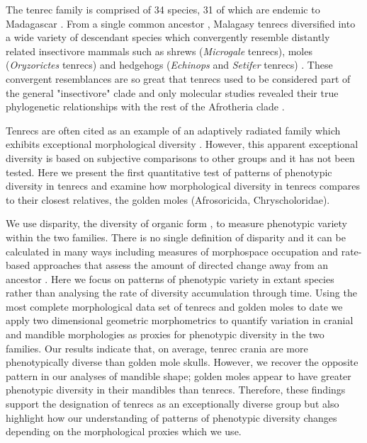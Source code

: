 \documentclass[12pt,a4paper]{article}
\begin{document}
The tenrec family is comprised of 34 species, 31 of which are endemic to Madagascar \citep{Olson2013}. From a single common ancestor \citep{Asher2006}, Malagasy tenrecs diversified into a wide variety of descendant species which convergently resemble distantly related insectivore mammals such as shrews (\textit{Microgale} tenrecs), moles (\textit{Oryzorictes} tenrecs) and hedgehogs (\textit{Echinops} and \textit{Setifer} tenrecs) \citep{Eisenberg1969}. These convergent resemblances are so great that tenrecs used to be considered part of the general "insectivore" clade and only molecular studies revealed their true phylogenetic relationships with the rest of the Afrotheria clade \citep{Stanhope1998}.  

Tenrecs are often cited as an example of an adaptively radiated family which exhibits exceptional morphological diversity \citep{Soarimalala2011, Olson2003, Eisenberg1969}. However, this apparent exceptional diversity is based on subjective comparisons to other groups and it has not been tested. Here we present the first quantitative test of patterns of phenotypic diversity in tenrecs and examine how morphological diversity in tenrecs compares to their closest relatives, the golden moles (Afrosoricida, Chryscholoridae). 

We use disparity, the diversity of organic form \citep{Foote1997, Wills1994, Erwin2007}, to measure phenotypic variety within the two families. There is no single definition of disparity and it can be calculated in many ways including measures of morphospace occupation \citep[e.g.][]{Goswami2011, Brusatte2008} and rate-based approaches that assess the amount of directed change away from an ancestor \citep{OMeara2006, Price2013}. Here we focus on patterns of phenotypic variety in extant species rather than analysing the rate of diversity accumulation through time. 
Using the most complete morphological data set of tenrecs and golden moles to date we apply two dimensional geometric morphometrics \citep{Rohlf1993, Adams2013} to quantify variation in cranial and mandible morphologies as proxies for phenotypic diversity in the two families. 
Our results indicate that, on average, tenrec crania are more phenotypically diverse than golden mole skulls. However, we recover the opposite pattern in our analyses of mandible shape; golden moles appear to have greater phenotypic diversity in their mandibles than tenrecs.
Therefore, these findings support the designation of tenrecs as an exceptionally diverse group but also highlight how our understanding of patterns of phenotypic diversity changes depending on the morphological proxies which we use.
\end{document}
